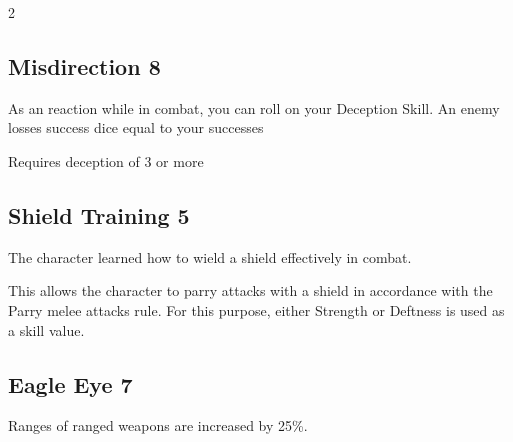 \begin{multicols}{2}
\begin{tcolorbox}
\end{tcolorbox}

\begin{tcolorbox}
    \subsection*{Misdirection \hfill \small{8 }}
    \tcblower
As an reaction while in combat, you can roll on your Deception Skill. An enemy losses success dice equal to your successes

Requires deception of 3 or more


\vspace{3mm}



\end{tcolorbox}

\begin{tcolorbox}
    \subsection*{Shield Training \hfill \small{5 }}
    \tcblower
The character learned how to wield a shield effectively in combat.

This allows the character to parry attacks with a shield in accordance with the Parry melee attacks rule. For this purpose, either Strength or Deftness is used as a skill value.


\vspace{3mm}



\end{tcolorbox}

\begin{tcolorbox}
    \subsection*{Eagle Eye \hfill \small{7 }}
    \tcblower
Ranges of ranged weapons are increased by 25\%.


\vspace{3mm}




\end{tcolorbox}
\end{multicols}

